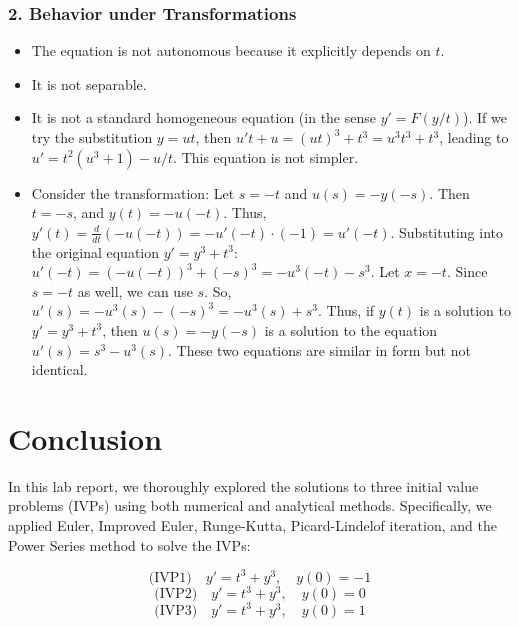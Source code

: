\documentclass{article}
\begin{document}
\subsubsection*{2. Behavior under Transformations}
\begin{itemize}
    \item The equation is not autonomous because it explicitly depends on $t$.
    \item It is not separable.
    \item It is not a standard homogeneous equation (in the sense $y' = F(y/t)$). If we try the substitution $y=ut$, then $u't + u = (ut)^3 + t^3 = u^3t^3 + t^3$, leading to $u' = t^2(u^3+1) - u/t$. This equation is not simpler.
    \item Consider the transformation: Let $s = -t$ and $u(s) = -y(-s)$. Then $t = -s$, and $y(t) = -u(-t)$.
    Thus, $y'(t) = \frac{d}{dt}(-u(-t)) = -u'(-t) \cdot (-1) = u'(-t)$.
    Substituting into the original equation $y' = y^3 + t^3$:
    $u'(-t) = (-u(-t))^3 + (-s)^3 = -u^3(-t) - s^3$.
    Let $x = -t$. Since $s = -t$ as well, we can use $s$. So, $u'(s) = -u^3(s) - (-s)^3 = -u^3(s) + s^3$.
    Thus, if $y(t)$ is a solution to $y' = y^3 + t^3$, then $u(s) = -y(-s)$ is a solution to the equation $u'(s) = s^3 - u^3(s)$. These two equations are similar in form but not identical.
\end{itemize}
















\section{Conclusion}

In this lab report, we thoroughly explored the solutions to three initial value problems (IVPs) using both numerical and analytical methods. Specifically, we applied Euler, Improved Euler, Runge-Kutta, Picard-Lindelof iteration, and the Power Series method to solve the IVPs:


\begin{equation*}
    \text{(IVP1)} \quad y' = t^3 +y^3, \quad y(0) = -1
\end{equation*}
\begin{equation*}
    \text{(IVP2)} \quad y' = t^3 +y^3, \quad y(0) = 0
\end{equation*}
\begin{equation*}
    \text{(IVP3)} \quad y' = t^3 +y^3, \quad y(0) = 1
\end{equation*}
\end{document}
